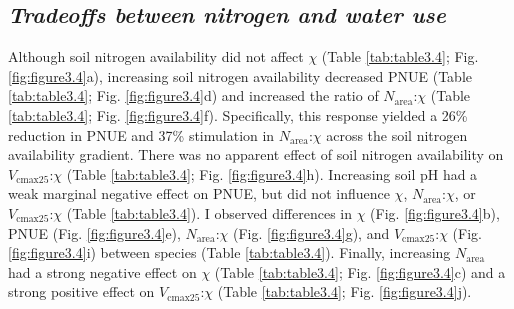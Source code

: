 \subsection{\textit{Tradeoffs between nitrogen and water use}}
\noindent Although soil nitrogen availability did not affect $\chi$ (Table \ref{tab:table3.4}; Fig. \ref{fig:figure3.4}a), increasing soil nitrogen availability decreased PNUE (Table \ref{tab:table3.4}; Fig. \ref{fig:figure3.4}d) and increased the ratio of $N_\mathrm{area}$:$\chi$ (Table \ref{tab:table3.4}; Fig. \ref{fig:figure3.4}f). Specifically, this response yielded a 26\% reduction in PNUE and 37\% stimulation in $N_\mathrm{area}$:$\chi$ across the soil nitrogen availability gradient. There was no apparent effect of soil nitrogen availability on $V_\mathrm{cmax25}$:$\chi$ (Table \ref{tab:table3.4}; Fig. \ref{fig:figure3.4}h). Increasing soil pH had a weak marginal negative effect on PNUE, but did not influence $\chi$, $N_\mathrm{area}$:$\chi$, or $V_\mathrm{cmax25}$:$\chi$ (Table \ref{tab:table3.4}). I observed differences in $\chi$ (Fig. \ref{fig:figure3.4}b), PNUE (Fig. \ref{fig:figure3.4}e), $N_\mathrm{area}$:$\chi$ (Fig. \ref{fig:figure3.4}g), and $V_\mathrm{cmax25}$:$\chi$ (Fig. \ref{fig:figure3.4}i) between species (Table \ref{tab:table3.4}). Finally, increasing $N_\mathrm{area}$ had a strong negative effect on $\chi$ (Table \ref{tab:table3.4}; Fig. \ref{fig:figure3.4}c) and a strong positive effect on $V_\mathrm{cmax25}$:$\chi$ (Table \ref{tab:table3.4}; Fig. \ref{fig:figure3.4}j).
\clearpage

